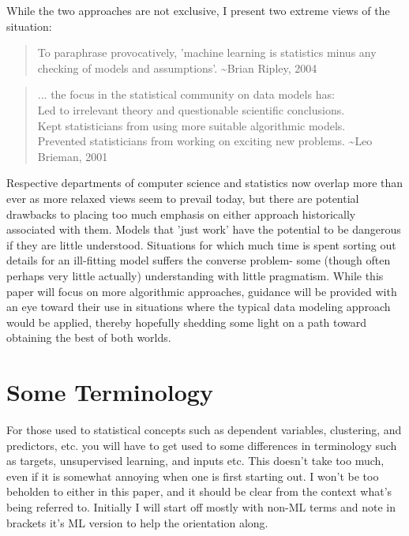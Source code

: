 \documentclass[english,nohyper,titlepage]{tufte-handout}\usepackage{knitr}
\begin{document}
While the two approaches are not exclusive, I present two extreme views of the situation:

\begin{quote}
To paraphrase provocatively, 'machine learning is statistics minus any checking of models and assumptions'.
\textasciitilde Brian Ripley, 2004
\end{quote}
\begin{quote}
... the focus in the statistical community on data models has:\\
Led to irrelevant theory and questionable scientific conclusions.\\
Kept statisticians from using more suitable algorithmic models.\\
Prevented statisticians from working on exciting new problems.
\textasciitilde Leo Brieman, 2001
\end{quote}


Respective departments of computer science and statistics now overlap more than ever as more relaxed views seem to prevail today, but there are potential drawbacks to placing too much emphasis on either approach historically associated with them.  Models that 'just work' have the potential to be dangerous if they are little understood.  Situations for which much time is spent sorting out details for an ill-fitting model suffers the converse problem- some (though often perhaps very little actually) understanding with little pragmatism.  While this paper will focus on more algorithmic approaches, guidance will be provided with an eye toward their use in situations where the typical data modeling approach would be applied, thereby hopefully shedding some light on a path toward obtaining the best of both worlds.

\section{Some Terminology}
For those used to statistical concepts such as dependent variables, clustering, and predictors, etc. you will have to get used to some differences in terminology such as targets, unsupervised learning, and inputs etc.  This doesn't take too much, even if it is somewhat annoying when one is first starting out.  I won't be too beholden to either in this paper, and it should be clear from the context what's being referred to.  Initially I will start off mostly with non-ML terms and note in brackets it's ML version to help the orientation along.
\end{document}
